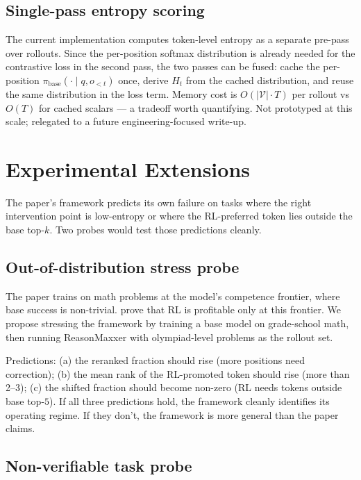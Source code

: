 \documentclass[11pt]{article}
\begin{document}
\subsection*{Single-pass entropy scoring}

The current implementation computes token-level entropy as a separate pre-pass over rollouts. Since the per-position softmax distribution is already needed for the contrastive loss in the second pass, the two passes can be fused: cache the per-position $\pi_{\text{base}}(\cdot \mid q, o_{<t})$ once, derive $H_t$ from the cached distribution, and reuse the same distribution in the loss term. Memory cost is $O(|\mathcal{V}| \cdot T)$ per rollout vs $O(T)$ for cached scalars — a tradeoff worth quantifying. Not prototyped at this scale; relegated to a future engineering-focused write-up.

\section*{Experimental Extensions}

The paper's framework predicts its own failure on tasks where the right intervention point is low-entropy or where the RL-preferred token lies outside the base top-$k$. Two probes would test those predictions cleanly.

\subsection*{Out-of-distribution stress probe}

The paper trains on math problems at the model's competence frontier, where base success is non-trivial. \citet{davis2025objective} prove that RL is profitable only at this frontier. We propose stressing the framework by training a base model on grade-school math, then running ReasonMaxxer with olympiad-level problems as the rollout set.

Predictions: (a) the reranked fraction should rise (more positions need correction); (b) the mean rank of the RL-promoted token should rise (more than 2--3); (c) the shifted fraction should become non-zero (RL needs tokens outside base top-$5$). If all three predictions hold, the framework cleanly identifies its operating regime. If they don't, the framework is more general than the paper claims.

\subsection*{Non-verifiable task probe}
\end{document}
